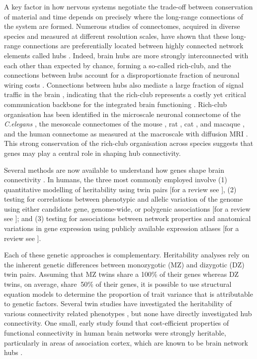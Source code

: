 A key factor in how nervous systems negotiate the trade-off between conservation of material and time depends on precisely where the long-range connections of the system are formed. Numerous studies of connectomes, acquired in diverse species and measured at different resolution scales, have shown that these long-range connections are preferentially located between highly connected network elements called hubs \citep{Harriger2012,Towlson2013,VandenHeuvel2011,VandenHeuvel2013b}. Indeed, brain hubs are more strongly interconnected with each other than expected by chance, forming a so-called rich-club, and the connections between hubs account for a disproportionate fraction of neuronal wiring costs \citep{Arnatkeviciute2018,Fulcher2016,Harriger2012,Towlson2013,VandenHeuvel2011}. Connections between hubs also mediate a large fraction of signal traffic in the brain \citep{Misic2016,VandenHeuvel2011}, indicating that the rich-club represents a costly yet critical communication backbone for the integrated brain functioning \citep{Gratton2012,Markov2013a,VandenHeuvel2018,VandenHeuvel2013a}. Rich-club organisation has been identified in the microscale neuronal connectome of the \textit{C.elegans} \citep{Towlson2013}, the mesoscale connectomes of the mouse \citep{Fulcher2016}, rat \citep{Liang2017}, cat \citep{DeReus2013b}, and macaque \citep{Harriger2012}, and the human connectome as measured at the macroscale with diffusion MRI \citep{VandenHeuvel2011}. This strong conservation of the rich-club organisation across species suggests that genes may play a central role in shaping hub connectivity.

Several methods are now available to understand how genes shape brain connectivity \citep{Lein2017,Luo2018}. In humans, the three most commonly employed involve (1) quantitative modelling of heritability using twin pairs [for a review see \citep{Jansen2015}], (2) testing for correlations between phenotypic and allelic variation of the genome using either candidate gene, genome-wide, or polygenic associations [for a review see \citep{Thompson2013}]; and (3) testing for associations between network properties and anatomical variations in gene expression using publicly available expression atlases [for a review see \citep{Fornito2019}].

Each of these genetic approaches is complementary. Heritability analyses rely on the inherent genetic differences between monozygotic (MZ) and dizygotic (DZ) twin pairs. Assuming that MZ twins share a 100\% of their genes whereas DZ twins, on average, share $~$50\% of their genes, it is possible to use structural equation models to determine the proportion of trait variance that is attributable to genetic factors. Several twin studies have investigated the heritability of various connectivity related phenotypes \citep{Bohlken2014,Colclough2017,Fu2015,Shen2014,Sudre2017}, but none have directly investigated hub connectivity. One small, early study found that cost-efficient properties of functional connectivity in human brain networks were strongly heritable, particularly in areas of association cortex, which are known to be brain network hubs \citep{Fornito2011}.

